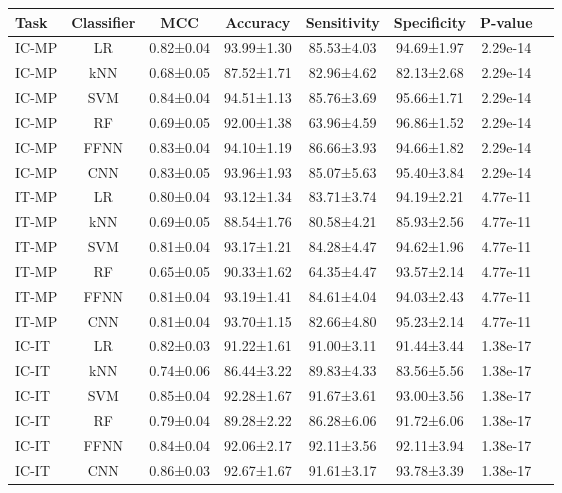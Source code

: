 \begin{tabular}{lccccccc}
\toprule
 Task & Classifier &       MCC &   Accuracy & Sensitivity & Specificity &  P-value \\
\midrule
IC-MP &         LR & 0.82±0.04 & 93.99±1.30 &  85.53±4.03 &  94.69±1.97 & 2.29e-14 \\
IC-MP &        kNN & 0.68±0.05 & 87.52±1.71 &  82.96±4.62 &  82.13±2.68 & 2.29e-14 \\
IC-MP &        SVM & 0.84±0.04 & 94.51±1.13 &  85.76±3.69 &  95.66±1.71 & 2.29e-14 \\
IC-MP &         RF & 0.69±0.05 & 92.00±1.38 &  63.96±4.59 &  96.86±1.52 & 2.29e-14 \\
IC-MP &       FFNN & 0.83±0.04 & 94.10±1.19 &  86.66±3.93 &  94.66±1.82 & 2.29e-14 \\
IC-MP &        CNN & 0.83±0.05 & 93.96±1.93 &  85.07±5.63 &  95.40±3.84 & 2.29e-14 \\
IT-MP &         LR & 0.80±0.04 & 93.12±1.34 &  83.71±3.74 &  94.19±2.21 & 4.77e-11 \\
IT-MP &        kNN & 0.69±0.05 & 88.54±1.76 &  80.58±4.21 &  85.93±2.56 & 4.77e-11 \\
IT-MP &        SVM & 0.81±0.04 & 93.17±1.21 &  84.28±4.47 &  94.62±1.96 & 4.77e-11 \\
IT-MP &         RF & 0.65±0.05 & 90.33±1.62 &  64.35±4.47 &  93.57±2.14 & 4.77e-11 \\
IT-MP &       FFNN & 0.81±0.04 & 93.19±1.41 &  84.61±4.04 &  94.03±2.43 & 4.77e-11 \\
IT-MP &        CNN & 0.81±0.04 & 93.70±1.15 &  82.66±4.80 &  95.23±2.14 & 4.77e-11 \\
IC-IT &         LR & 0.82±0.03 & 91.22±1.61 &  91.00±3.11 &  91.44±3.44 & 1.38e-17 \\
IC-IT &        kNN & 0.74±0.06 & 86.44±3.22 &  89.83±4.33 &  83.56±5.56 & 1.38e-17 \\
IC-IT &        SVM & 0.85±0.04 & 92.28±1.67 &  91.67±3.61 &  93.00±3.56 & 1.38e-17 \\
IC-IT &         RF & 0.79±0.04 & 89.28±2.22 &  86.28±6.06 &  91.72±6.06 & 1.38e-17 \\
IC-IT &       FFNN & 0.84±0.04 & 92.06±2.17 &  92.11±3.56 &  92.11±3.94 & 1.38e-17 \\
IC-IT &        CNN & 0.86±0.03 & 92.67±1.67 &  91.61±3.17 &  93.78±3.39 & 1.38e-17 \\
\bottomrule
\end{tabular}
